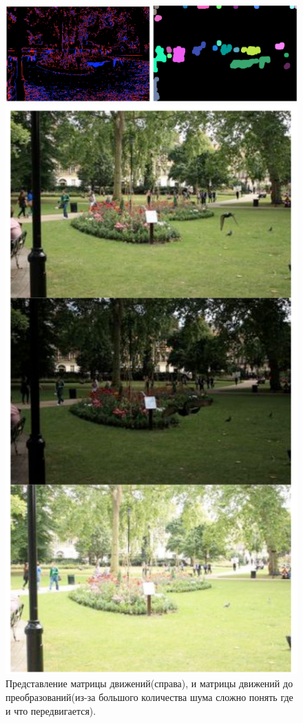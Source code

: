\begin{figure}[!tbp]
  \centering
  \begin{minipage}[b]{.8\textwidth}
    \includegraphics[width=\textwidth]{img/motionMap.png}
    \caption{ Представление матрицы движений(справа), и матрицы движений до преобразований(из-за большого количества шума сложно понять где и что передвигается).}
  \end{minipage}
  \hfill
  \begin{minipage}[b]{.2\textwidth}
    \includegraphics[width=\textwidth]{img/exposureSet.png}

\end{minipage}
\end{figure}
